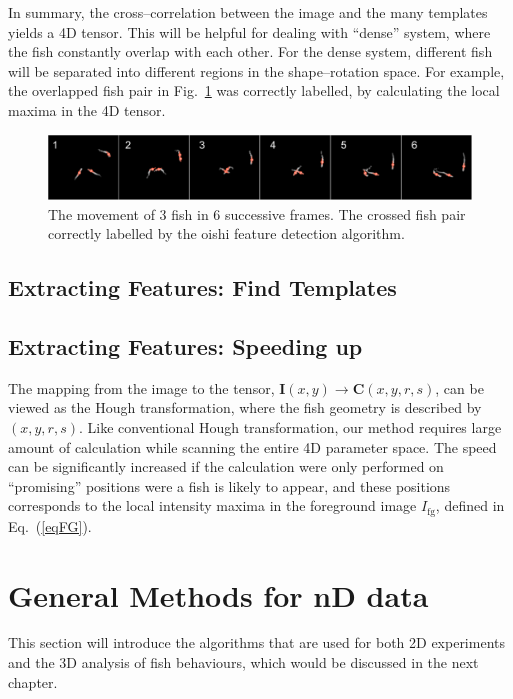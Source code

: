 \documentclass[11pt,twoside]{report}
\begin{document}
In summary, the cross--correlation between the image and the many templates yields a 4D tensor. This will be helpful for dealing with ``dense'' system, where the fish constantly overlap with each other. For the dense system, different fish will be separated into different regions in the shape--rotation space. For example, the overlapped fish pair in Fig.\ \ref{fig:fish_cross} was correctly labelled, by calculating the local maxima in the 4D tensor.


\begin{figure}
  \includegraphics[width=\linewidth,outer]{cross-resolve}
  \caption{The movement of 3 fish in 6 successive frames. The crossed fish pair correctly labelled by the oishi feature detection algorithm.}
  \label{fig:fish_cross}
\end{figure}


\subsection{Extracting Features: Find Templates}
\label{section:oishi_template}

\subsection{Extracting Features: Speeding up}
\label{section:oishi_optimise}

The mapping from the image to the tensor, $\mathbf{I}(x, y) \rightarrow \mathbf{C}(x, y, r, s)$, can be viewed as the Hough transformation, where the fish geometry is described by $(x, y, r, s)$. Like conventional Hough transformation, our method requires large amount of calculation while scanning the entire 4D parameter space. The speed can be significantly increased if the calculation were only performed on ``promising'' positions were a fish is likely to appear, and these positions corresponds to the local intensity maxima in the foreground image $I_\text{fg}$, defined in Eq.\ (\ref{eqFG}).

\section{General Methods for nD data}

This section will introduce the algorithms that are used for both 2D experiments and the 3D analysis of fish behaviours, which would be discussed in the next chapter.
\end{document}
